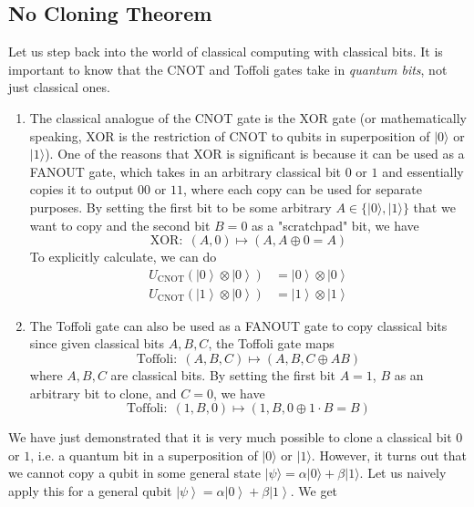 \documentclass{article}
\newcommand{\ket}[1]{\ensuremath{\left|#1\right\rangle}}
\begin{document}
  \subsection{No Cloning Theorem} 

    Let us step back into the world of classical computing with classical bits. It is important to know that the CNOT and Toffoli gates take in \textit{quantum bits}, not just classical ones.

    \begin{enumerate}
      \item The classical analogue of the CNOT gate is the XOR gate (or mathematically speaking, XOR is the restriction of CNOT to qubits in superposition of $|0\rangle$ or $|1\rangle$). One of the reasons that XOR is significant is because it can be used as a FANOUT gate, which takes in an arbitrary classical bit $0$ or $1$ and essentially copies it to output $00$ or $11$, where each copy can be used for separate purposes. By setting the first bit to be some arbitrary $A \in \{|0\rangle, |1\rangle\}$ that we want to copy and the second bit $B = 0$ as a "scratchpad" bit, we have 
      \begin{equation} 
        \text{XOR}: \; (A, 0) \mapsto (A, A \oplus 0 = A)
      \end{equation}
      To explicitly calculate, we can do 
      \begin{align} 
        U_{\mathrm{CNOT}} (\ket{0} \otimes \ket{0}) & = \ket{0} \otimes \ket{0} \\
        U_{\mathrm{CNOT}} (\ket{1} \otimes \ket{0}) & = \ket{1} \otimes \ket{1}
      \end{align}

      \item The Toffoli gate can also be used as a FANOUT gate to copy classical bits since given classical bits $A, B, C$, the Toffoli gate maps 
      \begin{equation} 
        \text{Toffoli}: \; (A, B, C) \mapsto (A, B, C \oplus A B)
      \end{equation}
      where $A, B, C$ are classical bits. By setting the first bit $A = 1$, $B$ as an arbitrary bit to clone, and $C=0$, we have 
      \begin{equation} 
        \text{Toffoli}: \; (1, B, 0) \mapsto (1, B, 0 \oplus 1\cdot B = B)
      \end{equation}
    \end{enumerate}

    We have just demonstrated that it is very much possible to clone a classical bit $0$ or $1$, i.e. a quantum bit in a superposition of $|0\rangle$ or $|1\rangle$. However, it turns out that we cannot copy a qubit in some general state $|\psi\rangle = \alpha |0\rangle + \beta |1\rangle$. Let us naively apply this for a general qubit $\ket{\psi} = \alpha \ket{0} + \beta \ket{1}$. We get
\end{document}
